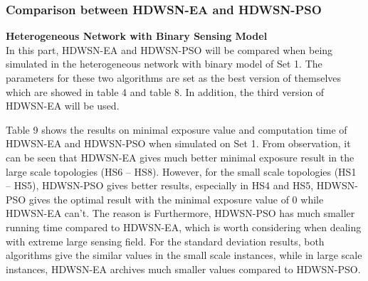 \documentclass[final]{elsarticle}
\begin{document}
\subsubsection{Comparison between HDWSN-EA and HDWSN-PSO}
\textbf{Heterogeneous Network with Binary Sensing Model}\\
In this part, HDWSN-EA and HDWSN-PSO will be compared when being simulated in the heterogeneous network with binary model of Set 1. The parameters for these two algorithms are set as the best version of themselves which are showed in table 4 and table 8. In addition, the third version of HDWSN-EA will be used.
\begin{table}
	\caption{Comparison between HDWSN-EA and HDWSN-PSO when running on Data set 1 (Heterogeneous - Binary) (\textit{Mev - Minimal exposure value, Time - Computation time (second)})}
	\label{tab7}
	\begin{center}
		\renewcommand{\arraystretch}{1.3}
	\end{center}
\end{table}
Table 9 shows the results on minimal exposure value and computation time of HDWSN-EA and HDWSN-PSO when simulated on Set 1. From observation, it can be seen that HDWSN-EA gives much better minimal exposure result in the large scale topologies (HS6 – HS8). However, for the small scale topologies (HS1 – HS5), HDWSN-PSO gives better results, especially in HS4 and HS5, HDWSN-PSO gives the optimal result with the minimal exposure value of 0 while HDWSN-EA can’t. The reason is     Furthermore, HDWSN-PSO has much smaller running time compared to HDWSN-EA, which is worth considering when dealing with extreme large sensing field. For the standard deviation results, both algorithms give the similar values in the small scale instances, while in large scale instances, HDWSN-EA archives much smaller values compared to HDWSN-PSO.
\end{document}
